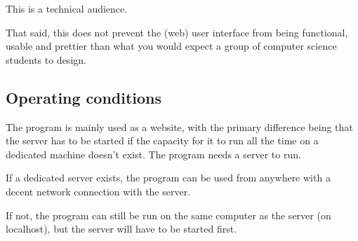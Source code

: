This is a technical audience.

That said, this does not prevent the (web) user interface from being functional,
 usable and prettier than what you would expect a group of 
 computer science students to design.
 

\subsection{Operating conditions}

The program is mainly used as a website, with the primary difference being
 that the server has to be started if the capacity for it to run 
 all the time on a dedicated machine doesn't exist. 
The program needs a server to run. 

If a dedicated server exists, the program can be used from anywhere
 with a decent network connection with the server.

If not, the program can still be run on the same computer as 
the server (on localhost), but the server will have to be started first.
 

